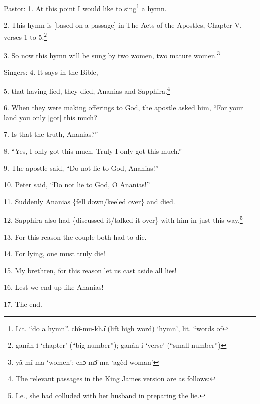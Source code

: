 
Pastor: 1. At this point I would like to sing\footnote{Lit. ``do a hymn''. chî-mu-khɔ̂ (lift high word) `hymn', lit. ``words of} a hymn.

2. This hymn is [based on a passage] in The Acts of the Apostles, Chapter V, verses
1 to 5.\footnote{ganân ɨ `chapter' (``big number''); ganân i `verse' (``small number'')}

3. So now this hymn will be sung by two women, two mature women.\footnote{yâ-mî-ma `women'; chɔ-mɔ̂-ma `agèd woman'}

Singers: 4. It says in the Bible,

5. that having lied, they died, Ananias and Sapphira.\footnote{The relevant passages in the King James version are as follows:}

6. When they were making offerings to God, the apostle asked him, ``For your land
you only [got] this much?

7. Is that the truth, Ananias?''

8. ``Yes, I only got this much. Truly I only got this much.''

9. The apostle said, ``Do not lie to God, Ananias!''

10. Peter said, ``Do not lie to God, O Ananias!''

11. Suddenly Ananias \{fell down/keeled over\} and died.

12. Sapphira also had \{discussed it/talked it over\} with him in just this way.\footnote{I.e., she had colluded with her husband in preparing the lie.}

13. For this reason the couple both had to die.

14. For lying, one must truly die!

15. My brethren, for this reason let us cast aside all lies!

16. Lest we end up like Ananias!

17. The end.

